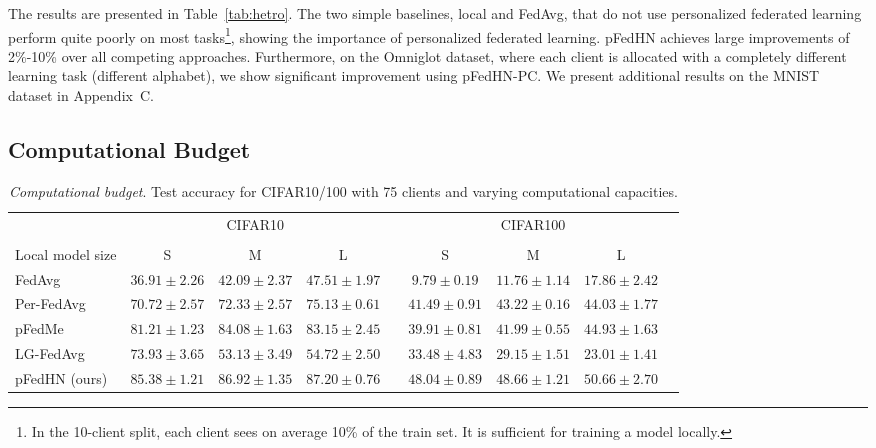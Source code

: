 \documentclass{article}
\newcommand\ourmethod{pFedHN}
\begin{document}
The results are presented in Table~\ref{tab:hetro}. 
The two simple baselines, local and FedAvg, that do not use personalized federated learning perform quite poorly on most tasks\footnote{In the 10-client split, each client sees on average 10\% of the train set. It is sufficient for training a model locally.}, showing the importance of personalized federated learning. \ourmethod{} achieves large improvements of 2\%-10\% over all competing approaches. Furthermore, on the Omniglot dataset, where each client is allocated with a completely different learning task (different alphabet), we show significant improvement using \ourmethod{}-PC. We present additional results on the MNIST dataset in Appendix~C.

\subsection{Computational Budget}\label{sec:comp}

\begin{table*}[t]
    \small
\centering
    \caption{\textit{Computational budget}. Test accuracy for CIFAR10/100 with 75 clients and varying computational capacities.}
    \vskip 0.11in
    \begin{tabular}{l c c c c c c c c}
    \toprule
    & \multicolumn{3}{c}{CIFAR10} && \multicolumn{3}{c}{CIFAR100} \\
     \cmidrule{2-4} \cmidrule{6-8}\\
    Local model size & S  & M & L && S  & M & L\\
    \midrule
    FedAvg & $36.91 \pm 2.26$ & $42.09 \pm 2.37$ & $47.51\pm 1.97$ && $9.79 \pm 0.19$ & $11.76 \pm 1.14$ & $17.86 \pm 2.42$\\
    Per-FedAvg & $70.72 \pm 2.57$ & $72.33 \pm 2.57$ & $75.13 \pm 0.61$ && $41.49 \pm 0.91$ & $43.22 \pm 0.16$ & $44.03 \pm 1.77$ \\
    pFedMe & $81.21 \pm 1.23$ & $84.08 \pm 1.63$ & $83.15 \pm 2.45$   && $39.91 \pm 0.81$ & $41.99 \pm 0.55$ & $44.93 \pm 1.63$ \\
    LG-FedAvg & $73.93 \pm 3.65$ & $53.13 \pm 3.49$ & $54.72 \pm 2.50$ && $33.48 \pm 4.83$ & $29.15 \pm 1.51$ & $23.01 \pm 1.41$\\
    \midrule
    \ourmethod{} (ours) & $\mathbf{85.38 \pm 1.21}$ & $\mathbf{86.92 \pm 1.35}$ & $\mathbf{87.20 \pm 0.76}$ && $\mathbf{48.04 \pm 0.89}$ & $\mathbf{48.66 \pm 1.21}$ & $\mathbf{50.66 \pm 2.70}$\\
\bottomrule
    \end{tabular}
    \label{tab:comp}
\end{table*}
\end{document}
